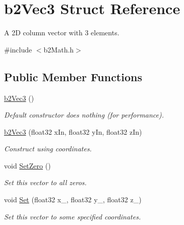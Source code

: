 \hypertarget{structb2_vec3}{}\section{b2\+Vec3 Struct Reference}
\label{structb2_vec3}


A 2D column vector with 3 elements.  




{\ttfamily \#include $<$b2\+Math.\+h$>$}

\subsection*{Public Member Functions}
\begin{DoxyCompactItemize}
\item 
\mbox{\label{structb2_vec3_a837423f66d6fb72d815e7390c09938b9}} 
\hyperlink{structb2_vec3_a837423f66d6fb72d815e7390c09938b9}{b2\+Vec3} ()
\begin{DoxyCompactList}\small\item\em Default constructor does nothing (for performance). \end{DoxyCompactList}\item 
\mbox{\label{structb2_vec3_a5db4043a3ea58894562081f1f68195d9}} 
\hyperlink{structb2_vec3_a5db4043a3ea58894562081f1f68195d9}{b2\+Vec3} (float32 x\+In, float32 y\+In, float32 z\+In)
\begin{DoxyCompactList}\small\item\em Construct using coordinates. \end{DoxyCompactList}\item 
\mbox{\label{structb2_vec3_a5a459ed49f1910a347ca247f848a2dd8}} 
void \hyperlink{structb2_vec3_a5a459ed49f1910a347ca247f848a2dd8}{Set\+Zero} ()
\begin{DoxyCompactList}\small\item\em Set this vector to all zeros. \end{DoxyCompactList}\item 
\mbox{\label{structb2_vec3_a12a1bc14bbe722dfb175a492d2d00a79}} 
void \hyperlink{structb2_vec3_a12a1bc14bbe722dfb175a492d2d00a79}{Set} (float32 x\+\_\+, float32 y\+\_\+, float32 z\+\_\+)
\begin{DoxyCompactList}\small\item\em Set this vector to some specified coordinates. \end{DoxyCompactList}\item 

\end{DoxyCompactItemize}
